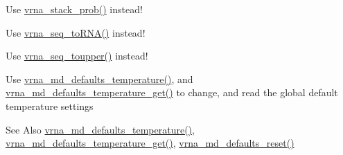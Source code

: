 \begin{DoxyRefList}
\item[\label{deprecated__deprecated000102}%
\hypertarget{deprecated__deprecated000102}{}%
Global \hyperlink{part__func_8h_ae856dd7a8d75c471c07153882bf1db48}{stack\-Prob} (double cutoff)]Use \hyperlink{group__pf__fold_ga26e3cc2eb127a35625572e9275c24ee4}{vrna\-\_\-stack\-\_\-prob()} instead!  
\item[\label{deprecated__deprecated000125}%
\hypertarget{deprecated__deprecated000125}{}%
Global \hyperlink{string__utils_8h_ad3f18dd83f958f18b2f26ecb99305208}{str\-\_\-\-D\-N\-A2\-R\-N\-A} (char $\ast$sequence)]Use \hyperlink{group__string__utils_gacfed92cba77064f6c743f9118d079bfc}{vrna\-\_\-seq\-\_\-to\-R\-N\-A()} instead!  
\item[\label{deprecated__deprecated000124}%
\hypertarget{deprecated__deprecated000124}{}%
Global \hyperlink{string__utils_8h_a17b796b806f96b70382077fb5bc519bb}{str\-\_\-uppercase} (char $\ast$sequence)]Use \hyperlink{group__string__utils_ga4f44dca03c9d708d68e64c0610bb9091}{vrna\-\_\-seq\-\_\-toupper()} instead!  
\item[\label{deprecated__deprecated000081}%
\hypertarget{deprecated__deprecated000081}{}%
Global \hyperlink{group__model__details_gab4b11c8d9c758430960896bc3fe82ead}{temperature} ]Use \hyperlink{group__model__details_gaf9e527e9a2f7e6fd6e42bc6e602f5445}{vrna\-\_\-md\-\_\-defaults\-\_\-temperature()}, and \hyperlink{group__model__details_ga96b24a74437f9ba46c4e06343155bf46}{vrna\-\_\-md\-\_\-defaults\-\_\-temperature\-\_\-get()} to change, and read the global default temperature settings \begin{DoxySeeAlso}{See Also}
\hyperlink{group__model__details_gaf9e527e9a2f7e6fd6e42bc6e602f5445}{vrna\-\_\-md\-\_\-defaults\-\_\-temperature()}, \hyperlink{group__model__details_ga96b24a74437f9ba46c4e06343155bf46}{vrna\-\_\-md\-\_\-defaults\-\_\-temperature\-\_\-get()}, \hyperlink{group__model__details_ga70834424cf804d149937de89f80ceb45}{vrna\-\_\-md\-\_\-defaults\-\_\-reset()}  
\end{DoxySeeAlso}


\end{DoxyRefList}
